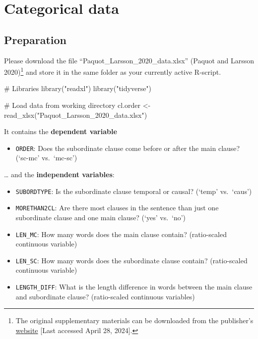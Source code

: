 \documentclass[
  11pt,
  letterpaper,
  DIV=11,
  numbers=noendperiod]{scrreprt}
\newenvironment{Shaded}{\begin{snugshade}}{\end{snugshade}}
\newcommand{\CommentTok}[1]{\textcolor[rgb]{0.37,0.37,0.37}{#1}}
\newcommand{\FunctionTok}[1]{\textcolor[rgb]{0.28,0.35,0.67}{#1}}
\newcommand{\NormalTok}[1]{\textcolor[rgb]{0.00,0.23,0.31}{#1}}
\newcommand{\OtherTok}[1]{\textcolor[rgb]{0.00,0.23,0.31}{#1}}
\newcommand{\StringTok}[1]{\textcolor[rgb]{0.13,0.47,0.30}{#1}}
\providecommand{\tightlist}{%
  \setlength{\itemsep}{0pt}\setlength{\parskip}{0pt}}\usepackage{longtable,booktabs,array}
\begin{document}
\chapter{Categorical data}\label{categorical-data}

\section{Preparation}\label{preparation-3}

Please download the file ``Paquot\_Larsson\_2020\_data.xlsx'' (Paquot
and Larsson 2020)\footnote{The original supplementary materials can be
  downloaded from the publisher's
  \href{https://link.springer.com/chapter/10.1007/978-3-030-46216-1_17}{website}
  {[}Last accessed April 28, 2024{]}.} and store it in the same folder
as your currently active R-script.

\begin{Shaded}
\begin{Highlighting}[]
\CommentTok{\# Libraries}
\FunctionTok{library}\NormalTok{(}\StringTok{"readxl"}\NormalTok{)}
\FunctionTok{library}\NormalTok{(}\StringTok{"tidyverse"}\NormalTok{)}

\CommentTok{\# Load data from working directory}
\NormalTok{cl.order }\OtherTok{\textless{}{-}} \FunctionTok{read\_xlsx}\NormalTok{(}\StringTok{"Paquot\_Larsson\_2020\_data.xlsx"}\NormalTok{)}
\end{Highlighting}
\end{Shaded}

It contains the \textbf{dependent variable}

\begin{itemize}
\tightlist
\item
  \texttt{ORDER}: Does the subordinate clause come before or after the
  main clause? (`sc-mc' vs.~`mc-sc')
\end{itemize}

\ldots{} and the \textbf{independent variables}:

\begin{itemize}
\item
  \texttt{SUBORDTYPE}: Is the subordinate clause temporal or causal?
  (`temp' vs.~`caus')
\item
  \texttt{MORETHAN2CL}: Are there most clauses in the sentence than just
  one subordinate clause and one main clause? (`yes' vs.~`no')
\item
  \texttt{LEN\_MC}: How many words does the main clause contain?
  (ratio-scaled continuous variable)
\item
  \texttt{LEN\_SC}: How many words does the subordinate clause contain?
  (ratio-scaled continuous variable)
\item
  \texttt{LENGTH\_DIFF}: What is the length difference in words between
  the main clause and subordinate clause? (ratio-scaled continuous
  variables)
\end{itemize}
\end{document}

